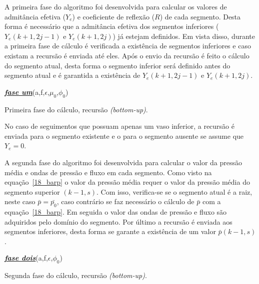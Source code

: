 \documentclass[
        english,			
        brazil			        %
        ,<...>]{abntbibufjf}
\begin{document}
A primeira fase do algoritmo foi desenvolvida para calcular os valores de admitância efetiva ($Y_e$) e coeficiente de reflexão ($R$) de cada segmento. Desta forma é necessário que a admitância efetiva dos segmentos inferiores ($Y_e(k+1,2j-1)$ e $Y_e(k+1,2j)$) já estejam definidos. Em vista disso, durante a primeira fase de cálculo é verificada a existência de segmentos inferiores e caso existam a recursão é enviada  até eles. Após o envio da recursão é feito o cálculo do segmento atual, desta forma o segmento inferior será definido antes do segmento atual e é garantida a existência de $Y_e(k+1,2j-1)$ e $Y_e(k+1,2j)$.

\begin{algorithm}[H]
	\textbf{\textit{\textsl{\underline{fase um}}}}(a,f,$\epsilon$,$\mu_0$,$\phi_0$) \\
	\caption{Primeira fase do cálculo, recursão \textit{(bottom-up)}.}
\end{algorithm}

No caso de seguimentos que possuam apenas um vaso inferior, a recursão é enviada para o segmento existente e o para o segmento ausente se assume que $Y_e = 0$.

A segunda fase do algoritmo foi desenvolvida para calcular o valor da pressão média e ondas de pressão e fluxo em cada segmento. Como visto na equação~\eqref{18_barp} o valor da pressão média requer o valor da pressão média do segmento superior $(k-1,s)$. Com isso, verifica-se se o segmento atual é a raiz, neste caso $\bar{p} = \bar{p_0}$, caso contrário se faz necessário o cálculo de $\bar{p}$ com a equação~\eqref{18_barp}. Em seguida o valor das ondas de pressão e fluxo são adquiridos pelo domínio do segmento. Por último a recursão é enviada aos segmentos inferiores, desta forma se garante a existência de um valor $\bar{p}(k-1,s)$.

\begin{algorithm}[H]
\textbf{\textit{\textsl{\underline{fase dois}}}}(a,f,$\epsilon$,$\phi_0$) \\
\caption{Segunda fase do cálculo, recursão \textit{(bottom-up)}.}
\end{algorithm}
\end{document}
